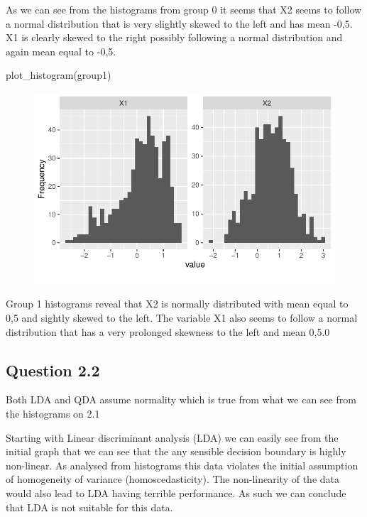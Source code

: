 \documentclass[
  letterpaper,
  DIV=11,
  numbers=noendperiod]{scrartcl}
\newenvironment{Shaded}{\begin{snugshade}}{\end{snugshade}}
\newcommand{\FunctionTok}[1]{\textcolor[rgb]{0.28,0.35,0.67}{#1}}
\newcommand{\NormalTok}[1]{\textcolor[rgb]{0.00,0.23,0.31}{#1}}
\begin{document}
As we can see from the histograms from group 0 it seems that X2 seems to
follow a normal distribution that is very slightly skewed to the left
and has mean -0,5. X1 is clearly skewed to the right possibly following
a normal distribution and again mean equal to -0,5.

\begin{Shaded}
\begin{Highlighting}[]
\FunctionTok{plot\_histogram}\NormalTok{(group1)}
\end{Highlighting}
\end{Shaded}

\begin{figure}[H]

{\centering \includegraphics{AssignmentAdvancedTopicsInStatistics_files/figure-pdf/unnamed-chunk-17-1.pdf}

}

\end{figure}

Group 1 histograms reveal that X2 is normally distributed with mean
equal to 0,5 and sightly skewed to the left. The variable X1 also seems
to follow a normal distribution that has a very prolonged skewness to
the left and mean 0,5.0

\hypertarget{question-2.2}{%
\subsection{Question 2.2}\label{question-2.2}}

Both LDA and QDA assume normality which is true from what we can see
from the histograms on 2.1

Starting with Linear discriminant analysis (LDA) we can easily see from
the initial graph that we can see that the any sensible decision
boundary is highly non-linear. As analysed from histograms this data
violates the initial assumption of homogeneity of variance
(homoscedasticity). The non-linearity of the data would also lead to LDA
having terrible performance. As such we can conclude that LDA is not
suitable for this data.
\end{document}
